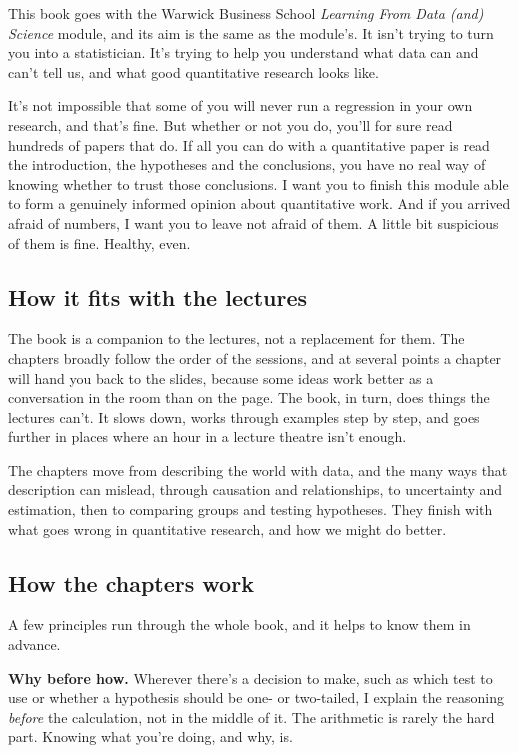 \documentclass[
]{book}
\begin{document}
This book goes with the Warwick Business School \emph{Learning From Data (and) Science} module, and its aim is the same as the module's. It isn't trying to turn you into a statistician. It's trying to help you understand what data can and can't tell us, and what good quantitative research looks like.

It's not impossible that some of you will never run a regression in your own research, and that's fine. But whether or not you do, you'll for sure read hundreds of papers that do. If all you can do with a quantitative paper is read the introduction, the hypotheses and the conclusions, you have no real way of knowing whether to trust those conclusions. I want you to finish this module able to form a genuinely informed opinion about quantitative work. And if you arrived afraid of numbers, I want you to leave not afraid of them. A little bit suspicious of them is fine. Healthy, even.

\subsection{How it fits with the lectures}\label{how-it-fits-with-the-lectures}

The book is a companion to the lectures, not a replacement for them. The chapters broadly follow the order of the sessions, and at several points a chapter will hand you back to the slides, because some ideas work better as a conversation in the room than on the page. The book, in turn, does things the lectures can't. It slows down, works through examples step by step, and goes further in places where an hour in a lecture theatre isn't enough.

The chapters move from describing the world with data, and the many ways that description can mislead, through causation and relationships, to uncertainty and estimation, then to comparing groups and testing hypotheses. They finish with what goes wrong in quantitative research, and how we might do better.

\subsection{How the chapters work}\label{how-the-chapters-work}

A few principles run through the whole book, and it helps to know them in advance.

\textbf{Why before how.} Wherever there's a decision to make, such as which test to use or whether a hypothesis should be one- or two-tailed, I explain the reasoning \emph{before} the calculation, not in the middle of it. The arithmetic is rarely the hard part. Knowing what you're doing, and why, is.
\end{document}
